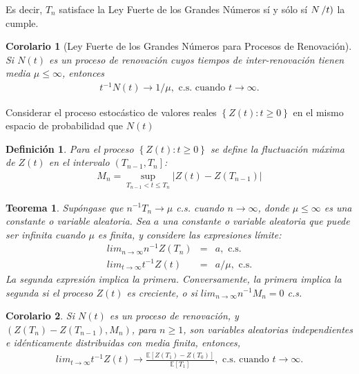 \documentclass{article}
\newtheorem{Def}{Definición}[section]
\newtheorem{Teo}{Teorema}[section]
\newtheorem{Coro}{Corolario}[section]
\newcommand{\esp}{\mathbb{E}}
\numberwithin{equation}{section}
\begin{document}
Es decir, $T_{n}$ satisface la Ley Fuerte de los Grandes N\'umeros s\'i y s\'olo s\'i $N\left/t\right)$ la cumple.


\begin{Coro}[Ley Fuerte de los Grandes N\'umeros para Procesos de Renovaci\'on]
Si $N\left(t\right)$ es un proceso de renovaci\'on cuyos tiempos de inter-renovaci\'on tienen media $\mu\leq\infty$, entonces
\begin{eqnarray}
t^{-1}N\left(t\right)\rightarrow 1/\mu,\textrm{ c.s. cuando }t\rightarrow\infty.
\end{eqnarray}

\end{Coro}


Considerar el proceso estoc\'astico de valores reales $\left\{Z\left(t\right):t\geq0\right\}$ en el mismo espacio de probabilidad que $N\left(t\right)$

\begin{Def}
Para el proceso $\left\{Z\left(t\right):t\geq0\right\}$ se define la fluctuaci\'on m\'axima de $Z\left(t\right)$ en el intervalo $\left(T_{n-1},T_{n}\right]$:
\begin{eqnarray*}
M_{n}=\sup_{T_{n-1}<t\leq T_{n}}|Z\left(t\right)-Z\left(T_{n-1}\right)|
\end{eqnarray*}
\end{Def}

\begin{Teo}
Sup\'ongase que $n^{-1}T_{n}\rightarrow\mu$ c.s. cuando $n\rightarrow\infty$, donde $\mu\leq\infty$ es una constante o variable aleatoria. Sea $a$ una constante o variable aleatoria que puede ser infinita cuando $\mu$ es finita, y considere las expresiones l\'imite:
\begin{eqnarray}
lim_{n\rightarrow\infty}n^{-1}Z\left(T_{n}\right)&=&a,\textrm{ c.s.}\\
lim_{t\rightarrow\infty}t^{-1}Z\left(t\right)&=&a/\mu,\textrm{ c.s.}
\end{eqnarray}
La segunda expresi\'on implica la primera. Conversamente, la primera implica la segunda si el proceso $Z\left(t\right)$ es creciente, o si $lim_{n\rightarrow\infty}n^{-1}M_{n}=0$ c.s.
\end{Teo}

\begin{Coro}
Si $N\left(t\right)$ es un proceso de renovaci\'on, y $\left(Z\left(T_{n}\right)-Z\left(T_{n-1}\right),M_{n}\right)$, para $n\geq1$, son variables aleatorias independientes e id\'enticamente distribuidas con media finita, entonces,
\begin{eqnarray}
lim_{t\rightarrow\infty}t^{-1}Z\left(t\right)\rightarrow\frac{\esp\left[Z\left(T_{1}\right)-Z\left(T_{0}\right)\right]}{\esp\left[T_{1}\right]},\textrm{ c.s. cuando  }t\rightarrow\infty.
\end{eqnarray}
\end{Coro}
\end{document}
